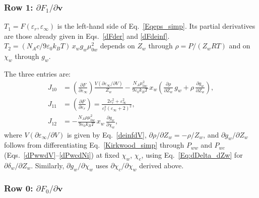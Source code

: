 \subsubsection*{Row 1: $\partial F_1 / \partial \mathbf{v}$}

$T_1 = F(\varepsilon_r,\varepsilon_\infty)$ is the left-hand side of
Eq.~\eqref{Eqeps_simp}.  Its partial derivatives are those already given in
Eqs.~\eqref{dFder} and \eqref{dFdeinf}.
$T_2 = (N_A c / 9\varepsilon_0 k_B T)\,x_w g_w \mu_{0w}^2$ depends on $Z_w$ through
$\rho = P/(Z_w RT)$ and on $\chi_w$ through $g_w$.

The three entries are:
\begin{align}
  J_{10} &= \left(\frac{\partial F}{\partial\varepsilon_\infty}\right)
             \frac{V(\partial\varepsilon_\infty/\partial V)}{Z_w}
             - \frac{N_A\mu_{0w}^2}{9\varepsilon_0 k_B T}\,x_w
             \left(\frac{\partial\rho}{\partial Z_w}\,g_w
                   + \rho\,\frac{\partial g_w}{\partial Z_w}\right), \label{Eq:J10} \\
  J_{11} &= \left(\frac{\partial F}{\partial\varepsilon_r}\right)
           = \frac{2\varepsilon_r^2 + \varepsilon_\infty^2}
                  {\varepsilon_r^2(\varepsilon_\infty+2)^2}, \label{Eq:J11} \\
  J_{12} &= -\frac{N_A\rho\mu_{0w}^2}{9\varepsilon_0 k_B T}\,x_w\,
              \frac{\partial g_w}{\partial \chi_w}, \label{Eq:J12}
\end{align}
where $V(\partial\varepsilon_\infty/\partial V)$ is given by Eq.~\eqref{deinfdV},
$\partial\rho/\partial Z_w = -\rho/Z_w$, and $\partial g_w/\partial Z_w$ follows
from differentiating Eq.~\eqref{Kirkwood_simp} through $P_{ww}$ and $P_{wc}$
(Eqs.~\eqref{dPwwdV}--\eqref{dPwcdNi}) at fixed $\chi_w$, $\chi_c$, using
Eq.~\eqref{Eq:dDelta_dZw} for $\partial\delta_w/\partial Z_w$.  Similarly,
$\partial g_w/\partial\chi_w$ uses $\partial\chi_c/\partial\chi_w$ derived above.

\subsubsection*{Row 0: $\partial F_0 / \partial \mathbf{v}$}

